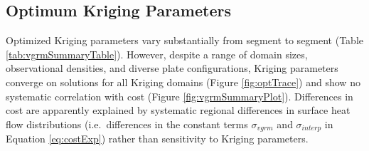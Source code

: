 \hypertarget{optimum-kriging-parameters}{%
\subsection{Optimum Kriging Parameters}\label{optimum-kriging-parameters}}

Optimized Kriging parameters vary substantially from segment to segment (Table \ref{tab:vgrmSummaryTable}). However, despite a range of domain sizes, observational densities, and diverse plate configurations, Kriging parameters converge on solutions for all Kriging domains (Figure \ref{fig:optTrace}) and show no systematic correlation with cost (Figure \ref{fig:vgrmSummaryPlot}). Differences in cost are apparently explained by systematic regional differences in surface heat flow distributions (i.e.~differences in the constant terms \(\sigma_{vgrm}\) and \(\sigma_{interp}\) in Equation \eqref{eq:costExp}) rather than sensitivity to Kriging parameters.

